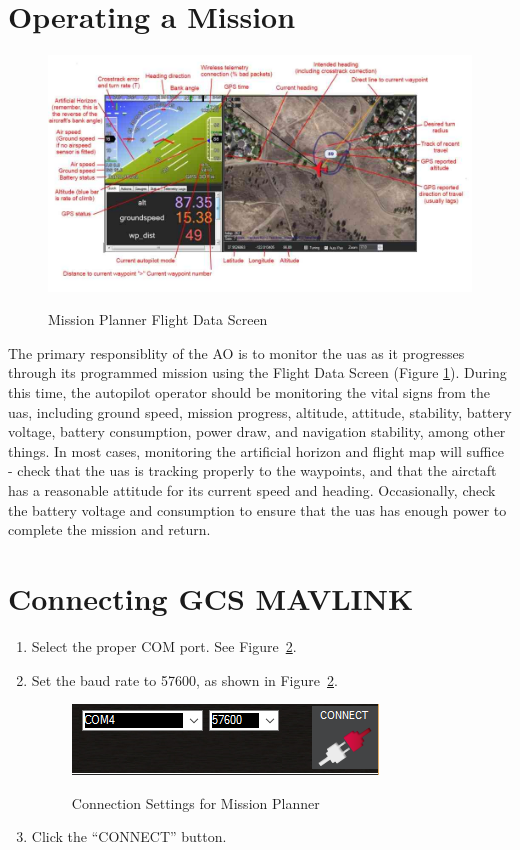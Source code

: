 \documentclass{report}
\begin{document}
	\section{Operating a Mission}
		\begin{figure}[ht]
			\centering
			\caption{Mission Planner Flight Data Screen}
			\includegraphics[width=\textwidth]{mp_hud_full.jpg}
			\label{fig:mp_flt_data}
		\end{figure}
		The primary responsiblity of the \gls{AO} is to monitor the \gls{uas} as it progresses through its programmed mission using the Flight Data Screen (Figure \ref{fig:mp_flt_data}).  During this time, the autopilot operator should be monitoring the vital signs from the \gls{uas}, including ground speed, mission progress, altitude, attitude, stability, battery voltage, battery consumption, power draw, and navigation stability, among other things.  In most cases, monitoring the artificial horizon and flight map will suffice - check that the \gls{uas} is tracking properly to the waypoints, and that the airctaft has a reasonable attitude for its current speed and heading.  Occasionally, check the battery voltage and consumption to ensure that the \gls{uas} has enough power to complete the mission and return.
	\section{Connecting GCS MAVLINK}
		\begin{enumerate}
			\item Select the proper COM port.  See Figure~\ref{fig:MP_Connect}.
			\item Set the baud rate to 57600, as shown in Figure~\ref{fig:MP_Connect}.
				\begin{figure}[ht]
					\centering
					\caption{Connection Settings for Mission Planner}
					\includegraphics{MisionPlanner_ConnectButton.png}
					\label{fig:MP_Connect}
				\end{figure}
			\item Click the ``CONNECT'' button.
		\end{enumerate}
\printglossaries
\end{document}

